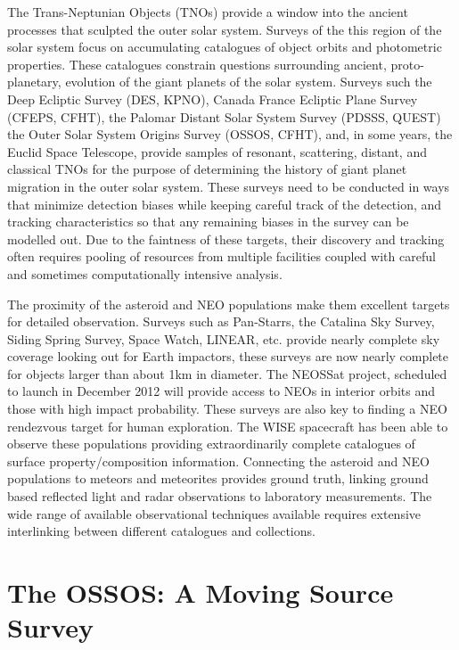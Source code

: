 The Trans-Neptunian Objects (TNOs) provide a window into the ancient processes that sculpted the outer solar system. Surveys of the this region of the solar system focus on accumulating catalogues of object orbits and photometric properties. These catalogues constrain questions surrounding ancient, proto-planetary, evolution of the giant planets of the solar system. Surveys such the Deep Ecliptic Survey (DES, KPNO),  Canada France Ecliptic Plane Survey (CFEPS, CFHT), the Palomar Distant Solar System Survey (PDSSS, QUEST)  the  Outer Solar System Origins Survey (OSSOS, CFHT),  and, in some years, the Euclid Space Telescope, provide samples of resonant, scattering, distant, and classical TNOs for the purpose of determining the history of giant planet migration in the outer solar system. These surveys need to be conducted in ways that minimize detection biases while keeping careful track of the detection, and tracking characteristics so that any remaining biases in the survey can be modelled out. Due to the faintness of these targets, their discovery and tracking often requires pooling of resources from multiple facilities coupled with careful and sometimes computationally intensive analysis.

The proximity of the asteroid and NEO populations make them excellent targets for detailed observation. Surveys such as Pan-Starrs, the Catalina Sky Survey, Siding Spring Survey, Space Watch, LINEAR, etc. provide nearly complete sky coverage looking out for Earth impactors, these surveys are now nearly complete for objects larger than about 1km in diameter. The NEOSSat project, scheduled to launch in December 2012 will provide access to NEOs in interior orbits and those with high impact probability. These surveys are also key to finding a NEO rendezvous target for human exploration. The WISE spacecraft has been able to observe these populations providing extraordinarily complete catalogues of surface property/composition information. Connecting the asteroid and NEO populations to meteors and meteorites provides ground truth, linking ground based reflected light and radar observations to laboratory measurements. The wide range of available observational techniques available requires extensive interlinking between different catalogues and collections.


\section{The OSSOS: A Moving Source Survey}

